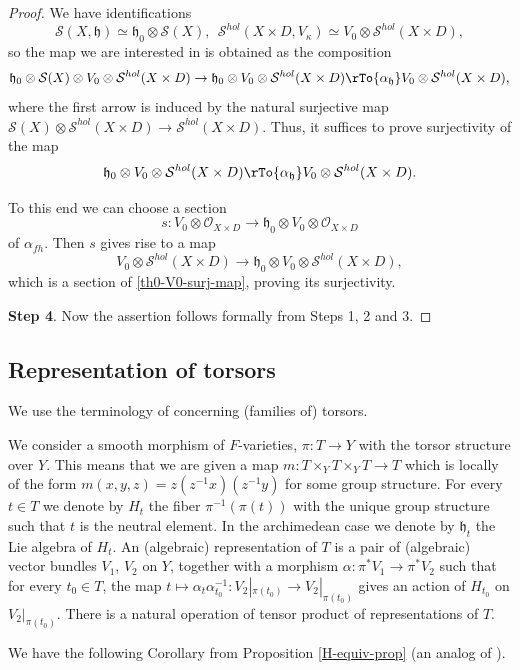 \documentclass[12pt,reqno]{amsart}
\theoremstyle{definition}
\theoremstyle{remark}
\numberwithin{equation}{section}
\newcommand{\ot}{\otimes}
\renewcommand{\SS}{{\mathcal S}}
\newcommand{\OO}{{\mathcal O}}
\renewcommand{\a}{\alpha}
\newcommand{\fh}{{\mathfrak h}}
\begin{document}
\begin{proof}
We have identifications
$$\SS(X,\fh)\simeq \fh_0\ot \SS(X), \ \ \SS^{hol}(X\times D,V_{\kappa})\simeq V_0\ot \SS^{hol}(X\times D),$$
so the map we are interested in is obtained as the composition
$$\fh_0\ot \SS(X)\ot V_0\ot \SS^{hol}(X\times D)\to \fh_0\ot V_0\ot \SS^{hol}(X\times D)\rTo{\a_{\fh}} V_0\ot \SS^{hol}(X\times D),$$
where the first arrow is induced by the natural surjective map $\SS(X)\ot \SS^{hol}(X\times D)\to \SS^{hol}(X\times D)$.
Thus, it suffices to prove surjectivity of the map
\begin{equation}\label{th0-V0-surj-map}
\fh_0\ot V_0\ot \SS^{hol}(X\times D)\rTo{\a_{\fh}} V_0\ot \SS^{hol}(X\times D).
\end{equation}

To this end we can choose a section 
$$s:V_0\ot \OO_{X\times D}\to \fh_0\ot V_0\ot \OO_{X\times D}$$
of $\a_{fh}$. Then $s$ gives rise to a map
$$V_0\ot \SS^{hol}(X\times D)\to \fh_0\ot V_0\ot \SS^{hol}(X\times D),$$
which is a section of \eqref{th0-V0-surj-map}, proving its surjectivity.

\noindent
{\bf Step 4}. Now the assertion follows formally from Steps 1, 2 and 3.
\end{proof}

\subsection{Representation of torsors}

We use the terminology of \cite[Sec.\ B.1.4]{AG-sm-tr} concerning (families of) torsors.

We consider a smooth morphism of $F$-varieties, $\pi:T\to Y$ with the torsor structure over $Y$. This means that we are given a map $m:T\times_Y T\times_Y T\to T$
which is locally of the form $m(x,y,z)=z(z^{-1}x)(z^{-1}y)$ for some group structure. For every $t\in T$ we denote by $H_t$ the fiber $\pi^{-1}(\pi(t))$ with the unique group structure
such that $t$ is the neutral element. In the archimedean case we denote by $\fh_t$ the Lie algebra of $H_t$.
An (algebraic) representation of $T$ is a pair of (algebraic) vector bundles $V_1$, $V_2$ on $Y$, together with a morphism 
$\a:\pi^*V_1\to \pi^*V_2$ such that for every $t_0\in T$, the map
$t\mapsto \a_t\a_{t_0}^{-1}:V_2|_{\pi(t_0)}\to V_2|_{\pi(t_0)}$ gives an action of $H_{t_0}$ on $V_2|_{\pi(t_0)}$. 
There is a natural operation of tensor product of representations of $T$.

We have the following Corollary from Proposition \ref{H-equiv-prop} (an analog of \cite[Cor.\ B.1.27]{AG-sm-tr}).
\end{document}
